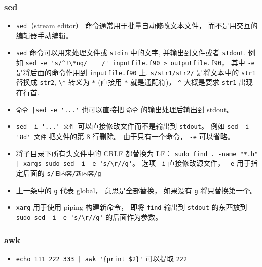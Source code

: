 \subsubsection{sed}
\begin{itemize}
\item \verb|sed|（stream editor） 命令通常用于批量自动修改文本文件， 而不是用交互的编辑器手动编辑。
\item \verb`sed` 命令可以用来处理文件或 \verb|stdin| 中的文字, 并输出到文件或者 \verb|stdout|. 例如
\verb|sed -e 's/^!\*nq/    /' inputfile.f90 > outputfile.f90|， 其中 \verb`-e` 是将后面的命令作用到 \verb`inputfile.f90` 上. \verb`s/str1/str2/` 是将文本中的 \verb`str1` 替换成 \verb`str2`, \verb`\*` 转义为 \verb`*` (直接用 \verb`*` 就是通配符)， \verb`^` 大概是要求 \verb`str1` 出现在行首.
\item \verb`命令 |sed -e '...'` 也可以直接把 \verb|命令| 的输出处理后输出到 stdout。
\item \verb|sed -i '...' 文件| 可以直接修改文件而不是输出到 \verb|stdout|。 例如 \verb|sed -i '8d' 文件| 把文件的第 8 行删除。 由于只有一个命令， \verb|-e| 可以省略。
\item 将子目录下所有头文件中的 CRLF 都替换为 LF： \verb`sudo find . -name "*.h" | xargs sudo sed -i -e 's/\r//g'`。 选项 \verb`-i` 直接修改源文件， \verb`-e` 用于指定后面的 \verb`s/旧内容/新内容/g`
\item 上一条中的 \verb|g| 代表 global， 意思是全部替换， 如果没有 \verb|g| 将只替换第一个。
\item \verb`xarg` 用于使用 piping 构建新命令， 即将 \verb|find| 输出到 \verb|stdout| 的东西放到 \verb`sudo sed -i -e 's/\r//g'` 的后面作为参数。
\end{itemize}

\subsubsection{awk}
\begin{itemize}
\item \verb`echo 111 222 333 | awk '{print $2}'` 可以提取 \verb|222|
\end{itemize}

